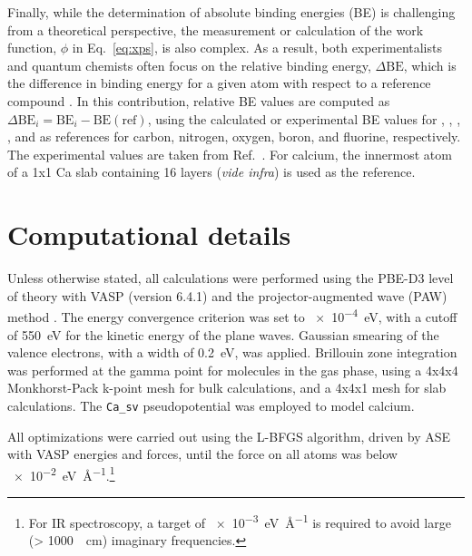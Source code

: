 \documentclass[12pt,a4paper]{article}
\begin{document}
Finally, while the determination of absolute binding energies (BE) is challenging from a theoretical perspective, the measurement or calculation of the work function, $\phi$ in Eq.~\eqref{eq:xps}, is also complex. As a result, both experimentalists and quantum chemists often focus on the relative binding energy, $\Delta\text{BE}$, which is the difference in binding energy for a given atom with respect to a reference compound \cite{vinesPredictionCoreLevel2018}. In this contribution, relative BE values are computed as $\Delta\text{BE}_i = \text{BE}_i - \text{BE}(\text{ref})$, using the calculated or experimental BE values for , , , , and  as references for carbon, nitrogen, oxygen, boron, and fluorine, respectively. The experimental values are taken from Ref.~\cite{pueyobellafontPredictingCoreLevel2017}. For calcium, the innermost atom of a 1x1 Ca slab containing 16 layers (\textit{vide infra}) is used as the reference.

	
\section{Computational details}

Unless otherwise stated, all calculations were performed using the PBE-D3 level of theory with VASP (version 6.4.1) and the projector-augmented wave (PAW) method \cite{blochlProjectorAugmentedwaveMethod1994}. The energy convergence criterion was set to \SI{e-4}{\electronvolt}, with a cutoff of \SI{550}{\electronvolt} for the kinetic energy of the plane waves. Gaussian smearing of the valence electrons, with a width of \SI{0.2}{\electronvolt}, was applied. Brillouin zone integration was performed at the gamma point for molecules in the gas phase, using a 4x4x4 Monkhorst-Pack k-point mesh for bulk calculations, and a 4x4x1 mesh for slab calculations. The \texttt{Ca\_sv} pseudopotential was employed to model calcium.

All optimizations were carried out using the L-BFGS algorithm, driven by ASE \cite{larsenAtomicSimulationEnvironment2017} with VASP energies and forces, until the force on all atoms was below \SI{e-2}{\electronvolt\per\angstrom}.\footnote{For IR spectroscopy, a target of \SI{e-3}{\electronvolt\per\angstrom} is required to avoid large (> \SI{1000}{\per\centi\meter}) imaginary frequencies.}
\end{document}
